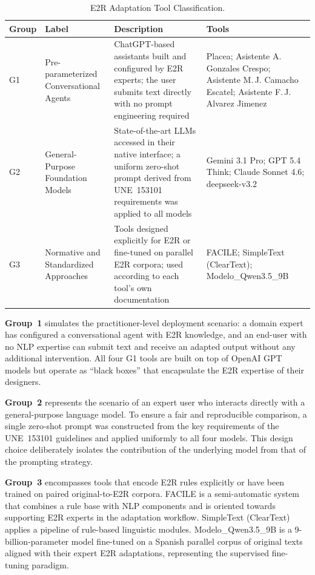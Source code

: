 \documentclass[12pt, a4paper]{article}
\begin{document}
\begin{table}[ht]
\centering
\caption{E2R Adaptation Tool Classification.}
\label{tab:tool-classification}
\begin{tabularx}{\textwidth}{@{} C{1.2cm} L{3.6cm} L{5.2cm} L{4cm} @{}}
\toprule
\textbf{Group} & \textbf{Label} & \textbf{Description} & \textbf{Tools} \\
\midrule
G1 & Pre-parameterized Conversational Agents
   & ChatGPT-based assistants built and configured by E2R experts; the user submits
     text directly with no prompt engineering required
   & Placea; Asistente A. Gonzales Crespo; Asistente M.\,J. Camacho Escatel;
     Asistente F.\,J. Alvarez Jimenez \\
\addlinespace
G2 & General-Purpose Foundation Models
   & State-of-the-art LLMs accessed in their native interface; a uniform zero-shot
     prompt derived from UNE~153101 requirements was applied to all models
   & Gemini 3.1 Pro; GPT 5.4 Think; Claude Sonnet 4.6; deepseek-v3.2 \\
\addlinespace
G3 & Normative and Standardized Approaches
   & Tools designed explicitly for E2R or fine-tuned on parallel E2R corpora; used
     according to each tool's own documentation
   & FACILE; SimpleText (ClearText); Modelo\_Qwen3.5\_9B \\
\bottomrule
\end{tabularx}
\end{table}

\textbf{Group~1} simulates the practitioner-level deployment scenario: a domain expert
has configured a conversational agent with E2R knowledge, and an end-user with no NLP
expertise can submit text and receive an adapted output without any additional
intervention. All four G1 tools are built on top of OpenAI GPT models but operate as
``black boxes'' that encapsulate the E2R expertise of their designers.

\textbf{Group~2} represents the scenario of an expert user who interacts directly with
a general-purpose language model. To ensure a fair and reproducible comparison, a single
zero-shot prompt was constructed from the key requirements of the UNE~153101 guidelines
and applied uniformly to all four models. This design choice deliberately isolates the
contribution of the underlying model from that of the prompting strategy.

\textbf{Group~3} encompasses tools that encode E2R rules explicitly or have been trained
on paired original-to-E2R corpora. FACILE is a semi-automatic system that combines a rule
base with NLP components and is oriented towards supporting E2R experts in the adaptation
workflow. SimpleText (ClearText) applies a pipeline of rule-based linguistic modules.
Modelo\_Qwen3.5\_9B is a 9-billion-parameter model fine-tuned on a Spanish parallel corpus
of original texts aligned with their expert E2R adaptations, representing the supervised
fine-tuning paradigm.
\end{document}
